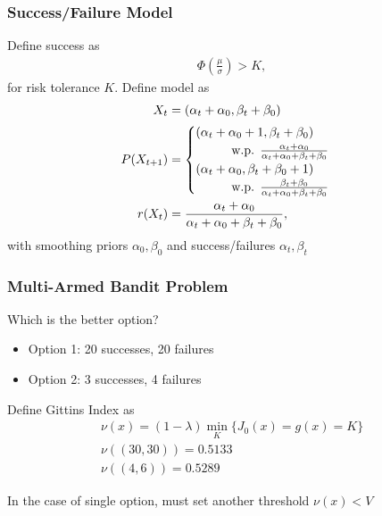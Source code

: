 \documentclass[compress, xcolor=pst]{beamer}
\newcommand\tab[1][1cm]{\hspace*{#1}}
\begin{document}
\begin{frame}
	\frametitle{\textbf{Success/Failure Model}}
	Define success as
	\begin{align*}
		\Phi(\frac{\mu}{\sigma}) > K,
	\end{align*}
	for risk tolerance $K$. Define model as
	\begin{align*}
	  X_t &= (\alpha_t + \alpha_0, \beta_t + \beta_0) \\
	  P(X_{t+1}) &=
	  \begin{cases}
	      (\alpha_t + \alpha_0 + 1, \beta_t + \beta_0)
	      \\ \tab\text{w.p. } \frac{\alpha_t + \alpha_0}{\alpha_t + \alpha_0 + \beta_t + \beta_0}\\
	      (\alpha_t + \alpha_0, \beta_t + \beta_0 + 1)
	      \\ \tab\text{w.p. } \frac{\beta_t + \beta_0}{\alpha_t + \alpha_0 + \beta_t + \beta_0}
	  \end{cases}\\
	  r(X_t) &= \frac{\alpha_t + \alpha_0}{\alpha_t + \alpha_0 + \beta_t + \beta_0},
	\end{align*}
	with smoothing priors $\alpha_0,\beta_0$ and success/failures $\alpha_t,\beta_t$
\end{frame}

\begin{frame}
	\frametitle{\textbf{Multi-Armed Bandit Problem}}
	Which is the better option?
	\begin{itemize}
		\item Option 1: 20 successes, 20 failures
		\item Option 2: 3 successes, 4 failures
	\end{itemize}
	Define Gittins Index as
	\begin{gather*}
	  \nu(x) = (1-\lambda)\min_{K} \{J_0(x) = g(x) = K\}\\
	  \nu((30, 30)) = 0.5133\\
	  \nu((4, 6)) = 0.5289
	\end{gather*}

	In the case of single option, must set another threshold $\nu(x) < V$
\end{frame}
\end{document}
